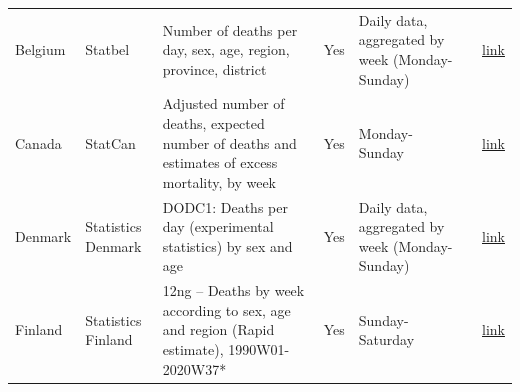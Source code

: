 \documentclass[
]{article}
\begin{document}
\begin{landscape}
\begin{table}[]
\begin{tabular}{p{.5in}p{1.5in}p{2in}p{1in}p{1.5in}p{1in}p{.5in}}
Belgium & Statbel &  Number of deaths per day, sex, age, region, province, district  &
Yes & Daily data, aggregated by week (Monday-Sunday) & &  \href{https://statbel.fgov.be/en/open-data/number-deaths-day-sex-district-age}{link} \\
Canada           & StatCan                                                                                                                                                              & Adjusted number of deaths, expected number of deaths and   estimates of excess mortality, by week                                                                          & Yes               & Monday-Sunday                                            &                                                                          & \href{https://www150.statcan.gc.ca/t1/tbl1/en/tv.action?pid=1310078401}{link}                                                                                                                                                                                                                                                              \\
Denmark          & Statistics Denmark                                                                                                                                                   &  DODC1: Deaths per day (experimental statistics) by sex and age                                                                                                  & Yes               & Daily data, aggregated by week (Monday-Sunday)                                          &                                                                          & \href{https://www.statbank.dk/dodc2}{link}                                                                                                                                                                                                                                                                                                 \\
Finland          & Statistics Finland                                                                                                                                                   & 12ng -- Deaths by week according to sex, age and region (Rapid estimate), 1990W01-2020W37*                                                                               & Yes               & Sunday-Saturday                                          &                                                                          & \href{https://pxnet2.stat.fi/PXWeb/pxweb/en/Kokeelliset\_tilastot/Kokeelliset\_tilastot\_\_vamuu\_koke/statfin\_vamuu\_pxt\_12ng.px/}{link}                                                                                                                                                                                                \\

\end{tabular}
\end{table}
\end{landscape}
\end{document}
